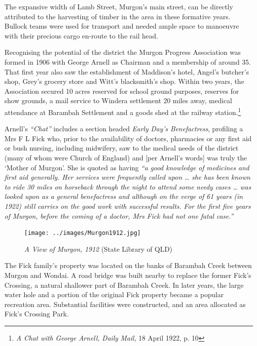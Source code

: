 \smallskip


The expansive width of Lamb Street, Murgon's main street, can be directly attributed to the harvesting of timber in the area in these formative years. Bullock teams were used for transport and needed ample space to manoeuvre with their precious cargo en-route to the rail head.



Recognising the potential of the district the Murgon Progress Association was formed in 1906 with George Arnell as Chairman and a membership of around 35. That first year also saw the establishment of Maddison's hotel, Angel's butcher's shop, Grey's grocery store and Witt's blacksmith's shop. Within two years, the Association secured 10 acres reserved for school ground purposes, reserves for show grounds, a mail service to Windera settlement 20 miles away, medical attendance at Barambah Settlement and a goods shed at the railway station.\footnote{\emph{A Chat with George Arnell, Daily Mail,} 18 April 1922, p. 10}


Arnell's \emph{``Chat''} includes a section headed \emph{Early Day's Benefactress}, profiling a Mrs F L Fick who, prior to the availability of doctors, pharmacies or any first aid or bush nursing, including midwifery, saw to the medical needs of the district (many of whom were Church of England) and {[}per Arnell's words{]} was truly the `Mother of Murgon'. She is quoted as having \emph{``a good knowledge of medicines and first aid generally. Her services were frequently called upon \ldots{} she has been known to ride 30 miles on horseback through the night to attend some needy cases \ldots{} was looked upon as a general benefactress and although on the verge of 61 years (in 1922) still carries on the good work with successful results. For the first five years of Murgon, before the coming of a doctor, Mrs Fick had not one fatal case.''}









\begin{figure}[htb]
\begin{center}
\texttt{[image: ../images/Murgon1912.jpg]}
\caption{{\itshape A View of Murgon, 1912} {\scriptsize(State Library of QLD)}}
\end{center}
\end{figure}


The Fick family's property was located on the banks of Barambah Creek between Murgon and Wondai. A road bridge was built nearby to replace the former Fick's Crossing\emph{,} a natural shallower part of Barambah Creek. In later years, the large water hole and a portion of the original Fick property became a popular recreation area. Substantial facilities were constructed, and an area allocated as Fick's Crossing Park\emph{.}



